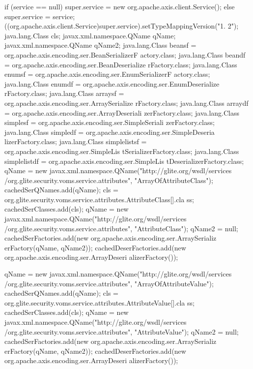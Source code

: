 \begin{DoxyCode}
                                                                                 
                              {
        if (service == null) {
            super.service = new org.apache.axis.client.Service();
        } else {
            super.service = service;
        }
        ((org.apache.axis.client.Service)super.service).setTypeMappingVersion("1.
      2");
            java.lang.Class cls;
            javax.xml.namespace.QName qName;
            javax.xml.namespace.QName qName2;
            java.lang.Class beansf = org.apache.axis.encoding.ser.BeanSerializerF
      actory.class;
            java.lang.Class beandf = org.apache.axis.encoding.ser.BeanDeserialize
      rFactory.class;
            java.lang.Class enumsf = org.apache.axis.encoding.ser.EnumSerializerF
      actory.class;
            java.lang.Class enumdf = org.apache.axis.encoding.ser.EnumDeserialize
      rFactory.class;
            java.lang.Class arraysf = org.apache.axis.encoding.ser.ArraySerialize
      rFactory.class;
            java.lang.Class arraydf = org.apache.axis.encoding.ser.ArrayDeseriali
      zerFactory.class;
            java.lang.Class simplesf = org.apache.axis.encoding.ser.SimpleSeriali
      zerFactory.class;
            java.lang.Class simpledf = org.apache.axis.encoding.ser.SimpleDeseria
      lizerFactory.class;
            java.lang.Class simplelistsf = org.apache.axis.encoding.ser.SimpleLis
      tSerializerFactory.class;
            java.lang.Class simplelistdf = org.apache.axis.encoding.ser.SimpleLis
      tDeserializerFactory.class;
            qName = new javax.xml.namespace.QName("http://glite.org/wsdl/services
      /org.glite.security.voms.service.attributes", "ArrayOfAttributeClass");
            cachedSerQNames.add(qName);
            cls = org.glite.security.voms.service.attributes.AttributeClass[].cla
      ss;
            cachedSerClasses.add(cls);
            qName = new javax.xml.namespace.QName("http://glite.org/wsdl/services
      /org.glite.security.voms.service.attributes", "AttributeClass");
            qName2 = null;
            cachedSerFactories.add(new org.apache.axis.encoding.ser.ArraySerializ
      erFactory(qName, qName2));
            cachedDeserFactories.add(new org.apache.axis.encoding.ser.ArrayDeseri
      alizerFactory());

            qName = new javax.xml.namespace.QName("http://glite.org/wsdl/services
      /org.glite.security.voms.service.attributes", "ArrayOfAttributeValue");
            cachedSerQNames.add(qName);
            cls = org.glite.security.voms.service.attributes.AttributeValue[].cla
      ss;
            cachedSerClasses.add(cls);
            qName = new javax.xml.namespace.QName("http://glite.org/wsdl/services
      /org.glite.security.voms.service.attributes", "AttributeValue");
            qName2 = null;
            cachedSerFactories.add(new org.apache.axis.encoding.ser.ArraySerializ
      erFactory(qName, qName2));
            cachedDeserFactories.add(new org.apache.axis.encoding.ser.ArrayDeseri
      alizerFactory());

}
\end{DoxyCode}
